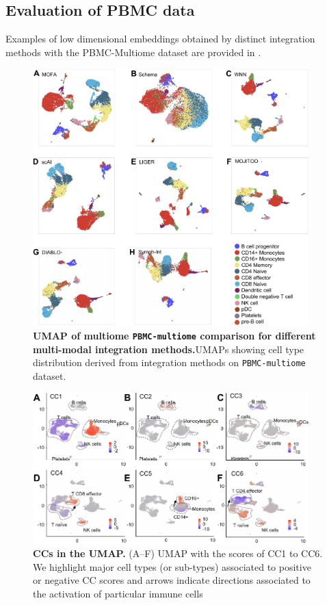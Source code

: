 \subsection{Evaluation of PBMC data}
Examples of low dimensional embeddings obtained by distinct integration methods with the PBMC-Multiome dataset are provided in .
\begin{figure}[!ht]
	\centering
	\includegraphics[width=0.95\textwidth]{pbmc_multiome_umap/fig}
	\vspace{0.1cm}
	\caption[UMAP of multiome PBMC comparison for different multi-modal integration methods.]{\textbf{UMAP of multiome \texttt{PBMC-multiome} comparison for different multi-modal integration methods.}UMAPs showing cell type distribution derived from integration methods on \texttt{PBMC-multiome} dataset. }
	\label{fig:pbmc_multiome_umap}
\end{figure}

\begin{figure}[!ht]
	\centering
	\includegraphics[width=0.95\textwidth]{CC_UMAP/fig}
	\vspace{0.1cm}
	\caption[CCs in the UMAP.]{\textbf{CCs in the UMAP.} (A–F) UMAP with the scores of CC1 to CC6. We highlight major cell types (or sub-types) associated to positive or negative CC scores and arrows indicate directions associated to the activation of particular immune cells}
	\label{fig:CC_UMAP}
\end{figure}


